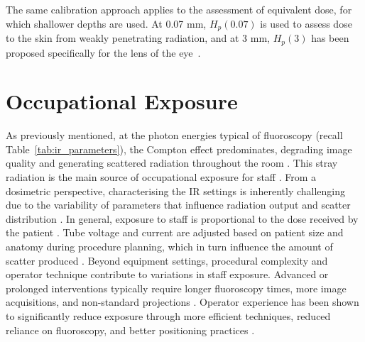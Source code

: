 The same calibration approach applies to the assessment of equivalent dose, for which shallower depths are used. At 0.07 mm, $H_p(0.07)$ is used to assess dose to the skin from weakly penetrating radiation, and at 3 mm, $H_p(3)$  has been proposed specifically for the lens of the eye~\cite{13}.

\section{Occupational Exposure}

As previously mentioned, at the photon energies typical of fluoroscopy (recall Table~\ref{tab:ir_parameters}), the Compton effect predominates, degrading image quality and generating scattered radiation throughout the room \cite{6,23}. This stray radiation is the main source of occupational exposure for staff \cite{24}. From a dosimetric perspective, characterising the IR settings is inherently challenging due to the variability of parameters that influence radiation output and scatter distribution \cite{30}. In general, exposure to staff is proportional to the dose received by the patient \cite{21}. Tube voltage and current are adjusted based on patient size and anatomy during procedure planning, which in turn influence the amount of scatter produced \cite{30,31}. Beyond equipment settings, procedural complexity and operator technique contribute to variations in staff exposure. Advanced or prolonged interventions typically require longer fluoroscopy times, more image acquisitions, and non-standard projections \cite{30}. Operator experience has been shown to significantly reduce exposure through more efficient techniques, reduced reliance on fluoroscopy, and better positioning practices \cite{33}.

